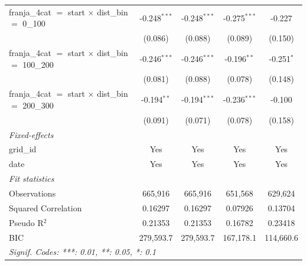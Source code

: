 \begin{tabular}{lcccc}
   franja\_4cat $=$ start $\times$ dist\_bin $=$ 0\_100                   & -0.248$^{***}$ & -0.248$^{***}$ & -0.275$^{***}$ & -0.227\\   
                                                                          & (0.086)        & (0.088)        & (0.089)        & (0.150)\\   
   franja\_4cat $=$ start $\times$ dist\_bin $=$ 100\_200                 & -0.246$^{***}$ & -0.246$^{***}$ & -0.196$^{**}$  & -0.251$^{*}$\\   
                                                                          & (0.081)        & (0.088)        & (0.078)        & (0.148)\\   
   franja\_4cat $=$ start $\times$ dist\_bin $=$ 200\_300                 & -0.194$^{**}$  & -0.194$^{***}$ & -0.236$^{***}$ & -0.100\\   
                                                                          & (0.091)        & (0.071)        & (0.078)        & (0.158)\\   
   \midrule
   \emph{Fixed-effects}\\
   grid\_id                                                               & Yes            & Yes            & Yes            & Yes\\  
   date                                                                   & Yes            & Yes            & Yes            & Yes\\  
   \midrule
   \emph{Fit statistics}\\
   Observations                                                           & 665,916        & 665,916        & 651,568        & 629,624\\  
   Squared Correlation                                                    & 0.16297        & 0.16297        & 0.07926        & 0.13704\\  
   Pseudo R$^2$                                                           & 0.21353        & 0.21353        & 0.16782        & 0.23418\\  
   BIC                                                                    & 279,593.7      & 279,593.7      & 167,178.1      & 114,660.6\\  
   \midrule \midrule
   \multicolumn{5}{l}{\emph{Signif. Codes: ***: 0.01, **: 0.05, *: 0.1}}\\
\end{tabular}
\par\endgroup


